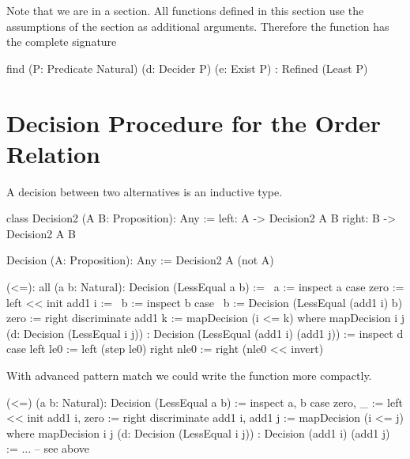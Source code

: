 Note that we are in a section. All functions defined in this section use the
assumptions of the section as additional arguments. Therefore the function
 has the complete signature
%
\begin{alba}
    find
        (P: Predicate Natural) (d: Decider P) (e: Exist P)
        : Refined (Least P)
\end{alba}







\vskip 5mm
\section{Decision Procedure for the Order Relation}



A decision between two alternatives is an inductive type.

\begin{alba}
    class Decision2 (A B: Proposition): Any :=
        left: A  -> Decision2 A B
        right: B -> Decision2 A B

    Decision (A: Proposition): Any :=
        Decision2 A (not A)
\end{alba}



\begin{alba}
    (<=): all (a b: Natural): Decision (LessEqual a b) :=
        \ a :=
            inspect a case
                zero :=
                    left << init
                add1 i :=
                    \ b :=
                        inspect b case
                            {\ b := Decision (LessEqual (add1 i) b)}
                            zero :=
                                right discriminate
                            add1 k :=
                                mapDecision (i <= k)
        where
            mapDecision
                {i j} (d: Decision (LessEqual i j))
                : Decision (LessEqual (add1 i) (add1 j))
            :=
                inspect d case
                    left le0 :=
                        left (step le0)
                    right nle0 :=
                        right (nle0 << invert)
\end{alba}

With advanced pattern match we could write the function more compactly.

\begin{alba}
    (<=) (a b: Natural): Decision (LessEqual a b) :=
        inspect
            a, b
        case
            zero, _ :=
                left << init
            add1 i, zero :=
                right discriminate
            add1 i, add1 j :=
                mapDecision (i <= j)
        where
            mapDecision {i j} (d: Decision (LessEqual i j))
                : Decision (add1 i) (add1 j)
            :=
                ... -- see above
\end{alba}





